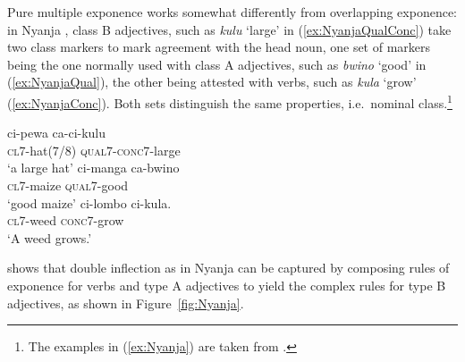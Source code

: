 \documentclass[output=paper
 	        ,biblatex
                ,babelshorthands
                ,newtxmath
                ,draftmode
                ,colorlinks, citecolor=brown
]{langscibook}
\begin{document}
\begin{exe}
\begin{xlist}
\begin{exe}
\begin{xlist}
Pure multiple exponence works somewhat differently from
overlapping exponence: in Nyanja \citep{Stump01,Crysmann:14:OUP},
class B adjectives, such as \textit{kulu} `large' in (\ref{ex:NyanjaQualConc}) take two class markers to
mark agreement with the head noun, one set of markers being the one
normally used with class A adjectives, such as \textit{bwino} `good' in (\ref{ex:NyanjaQual}), the other being attested with
verbs, such as \textit{kula} `grow' (\ref{ex:NyanjaConc}). Both sets distinguish the same
properties, i.e.\ nominal class.\label{Nyanja}\footnote{The examples in (\ref{ex:Nyanja}) are taken from .}

\eal
\label{ex:Nyanja}
\ex\label{ex:NyanjaQualConc}
\gll ci-pewa ca-ci-kulu\\
    \textsc{cl7}-hat(7/8) \textsc{qual7}-\textsc{conc7}-large\\
\glt `a large hat'
\ex
\label{ex:NyanjaQual} 
\gll ci-manga ca-bwino\\
    \textsc{cl7}-maize \textsc{qual7}-good\\
\glt `good maize'
\ex
\label{ex:NyanjaConc} 
\gll ci-lombo ci-kula.\\
    \textsc{cl7}-weed \textsc{conc7}-grow\\
\glt `A weed grows.'
\zl

\citet{Crysmann:14:OUP} shows that double inflection as in Nyanja
can be captured by composing rules of exponence for verbs and type A
adjectives to yield the complex rules for type B adjectives, as shown
in Figure~\ref{fig:Nyanja}. 


\end{xlist}
\end{exe}
\end{xlist}
\end{exe}
\end{document}
